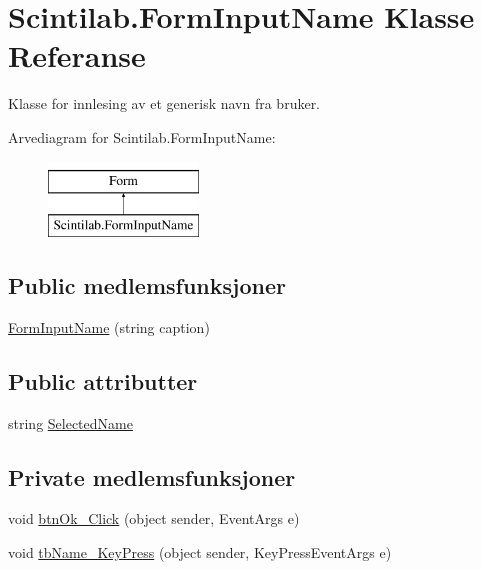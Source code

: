 \hypertarget{class_scintilab_1_1_form_input_name}{\section{Scintilab.\+Form\+Input\+Name Klasse Referanse}
\label{class_scintilab_1_1_form_input_name}
}


Klasse for innlesing av et generisk navn fra bruker.  


Arvediagram for Scintilab.\+Form\+Input\+Name\+:\begin{figure}[H]
\begin{center}
\leavevmode
\includegraphics[height=2.000000cm]{class_scintilab_1_1_form_input_name}
\end{center}
\end{figure}
\subsection*{Public medlemsfunksjoner}
\begin{DoxyCompactItemize}
\item 
\hyperlink{class_scintilab_1_1_form_input_name_a0dd3a62578332cfeb90a4fa212950a8d}{Form\+Input\+Name} (string caption)
\end{DoxyCompactItemize}
\subsection*{Public attributter}
\begin{DoxyCompactItemize}
\item 
string \hyperlink{class_scintilab_1_1_form_input_name_aab6aee0df21ac4b5ae151806373b450c}{Selected\+Name}
\end{DoxyCompactItemize}
\subsection*{Private medlemsfunksjoner}
\begin{DoxyCompactItemize}
\item 
void \hyperlink{class_scintilab_1_1_form_input_name_a7ba810a02a7b838eee75429c3c4bf7b1}{btn\+Ok\+\_\+\+Click} (object sender, Event\+Args e)
\item 
void \hyperlink{class_scintilab_1_1_form_input_name_ac25144763079c5cb49403059253bdfd4}{tb\+Name\+\_\+\+Key\+Press} (object sender, Key\+Press\+Event\+Args e)
\end{DoxyCompactItemize}


